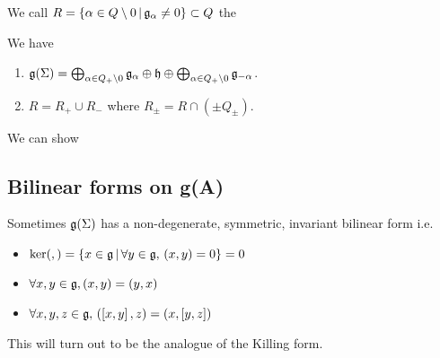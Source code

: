 \documentclass{article}
\begin{document}
\begin{definition}
We call $R = \pbrace{\alpha \in Q \setminus 0 \, | \, \mf{g}_\alpha \neq 0} \subset Q$ the 
\end{definition}

\begin{prop}
 We have
\begin{enumerate}
    \item $\mf{g}(\Sigma) = \bigoplus_{\alpha \in Q_+ \setminus 0} \mf{g}_\alpha \oplus \mf{h} \oplus \bigoplus_{\alpha \in Q_+ \setminus 0} \mf{g}_{-\alpha}$. 
    \item $R = R_+ \cup R_-$ where $R_\pm = R \cap (\pm Q_\pm)$. 
\end{enumerate}
\end{prop}

\begin{ex}
We can show 
\end{ex}

\subsection{Bilinear forms on g(A)}

Sometimes $\mf{g}(\Sigma)$ has a non-degenerate, symmetric, invariant bilinear form 
i.e. 
\begin{itemize}
    \item $\ker(,) = \pbrace{x \in \mf{g} \, | \, \forall y \in \mf{g}, \, (x,y) =0} = 0$
    \item $\forall x,y \in \mf{g}, (x,y) = (y,x)$
    \item $\forall x,y,z \in \mf{g}, \, (\comm[x]{y},z) = (x,\comm[y]{z})$
\end{itemize}

This will turn out to be the analogue of the Killing form. 
\end{document}
